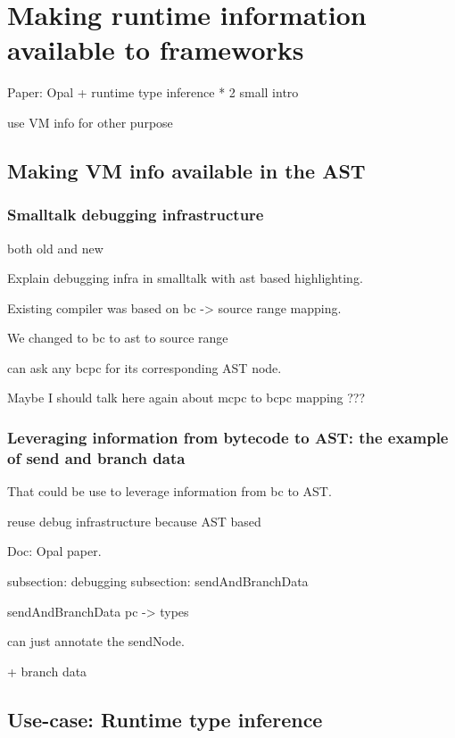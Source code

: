 \documentclass[a4paper,12pt,twoside]{../includes/ThesisStyle}
\begin{document}
\fi

\chapter{Making runtime information available to frameworks}
\label{chap:exploitation}
\minitoc

Paper: Opal + runtime type inference * 2
small intro

use VM info for other purpose

\section{Making VM info available in the AST}

\subsection{Smalltalk debugging infrastructure}

both old and new

Explain debugging infra in smalltalk with ast based highlighting.

Existing compiler was based on bc -> source range mapping.

We changed to bc to ast to source range

can ask any bcpc for its corresponding AST node.

Maybe I should talk here again about mcpc to bcpc mapping ???

\subsection{Leveraging information from bytecode to AST: the example of send and branch data}

That could be use to leverage information from bc to AST.

reuse debug infrastructure because AST based

Doc: Opal paper.

subsection: debugging
subsection: sendAndBranchData 

sendAndBranchData pc -> types

can just annotate the sendNode.

+ branch data

\section{Use-case: Runtime type inference}
\end{document}
